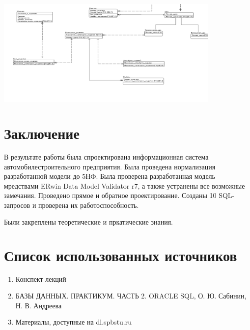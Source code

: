    \includegraphics[width=11cm]{./screenshots/model/model3.png}

\section{Заключение}
В результате работы была спроектирована информационная система автомобилестроительного предприятия.
Была проведена нормализация разработанной модели до 5НФ.
Была проверена разработанная модель мредствами ERwin Data Model Validator r7, а также устранены все возможные замечания.
Проведено прямое и обратное проектирование.
Созданы 10 SQL-запросов и проверена их работоспособность.

Были закреплены теоретические и пркатические знания.

\section{Список использованных источников}

\begin{enumerate}

    \item Конспект лекций
    \item БАЗЫ ДАННЫХ. ПРАКТИКУМ. ЧАСТЬ 2. ORACLE SQL, О. Ю. Сабинин, Н. В. Андреева
    \item Материалы, доступные на dl.spbstu.ru

\end{enumerate}

